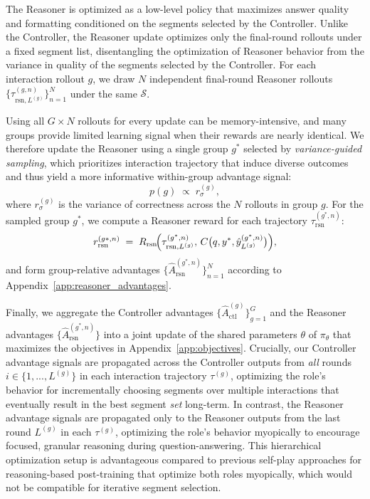 The Reasoner is optimized as a low-level policy that maximizes answer quality and formatting conditioned on the segments selected by the Controller.
Unlike the Controller, the Reasoner update optimizes only the final-round rollouts under a fixed segment list, disentangling the optimization of Reasoner behavior from the variance in quality of the segments selected by the Controller.
For each interaction rollout $g$, we draw $N$ independent final-round Reasoner rollouts
$\{\tau_{\text{rsn},L^{(g)}}^{(g,n)}\}_{n=1}^{N}$ under the same $\mathcal{S}$.

Using all $G\times N$ rollouts for every update can be memory-intensive, and many groups provide limited learning signal when their rewards are nearly identical. We therefore update the Reasoner using a single group $g^*$ selected by \emph{variance-guided sampling}, which prioritizes interaction trajectory that induce diverse outcomes and thus yield a more informative within-group advantage signal:
%
\begin{equation}
p(g) \;\propto\; r_\sigma^{(g)},
\end{equation}
where $r_\sigma^{(g)}$ is the variance of correctness across the $N$ rollouts in group $g$. For the sampled group $g^*$, we compute a Reasoner reward for each trajectory
$\tau_{\text{rsn}}^{(g^*,n)}$:
\begin{equation}
r_{\text{rsn}}^{(g*,n)} \;=\; R_{\text{rsn}}\!\Bigl(\tau_{\text{rsn},L^{(g)}}^{(g^*,n)},\, C\bigl(q,y^*,\hat{y}_{L^{(g)}}^{(g^*,n)}\bigr)\Bigr),
\end{equation}
and form group-relative advantages $\{\hat{A}_{\text{rsn}}^{(g^*,n)}\}_{n=1}^N$ according to Appendix~\ref{app:reasoner_advantages}.

Finally, we aggregate the Controller advantages $\{\hat{A}_{\text{ctl}}^{(g)}\}_{g=1}^G$ and the Reasoner advantages $\{\hat{A}_{\text{rsn}}^{(g^*,n)}\}$ into a joint update of the shared parameters $\theta$ of $\pi_\theta$ that maximizes the objectives in Appendix~\ref{app:objectives}. Crucially, our Controller advantage signals are propagated across the Controller outputs from \emph{all} rounds $i \in \{1, ..., L^{(g)}\}$ in each interaction trajectory $\tau^{(g)}$, optimizing the role's behavior for incrementally choosing segments over multiple interactions that eventually result in the best segment \emph{set} long-term. In contrast, the Reasoner advantage signals are propagated only to the Reasoner outputs from the last round $L^{(g)}$ in each $\tau^{(g)}$, optimizing the role's behavior myopically to encourage focused, granular reasoning during question-answering. This hierarchical optimization setup is advantageous compared to previous self-play approaches for reasoning-based post-training that optimize both roles myopically, which would not be compatible for iterative segment selection.

